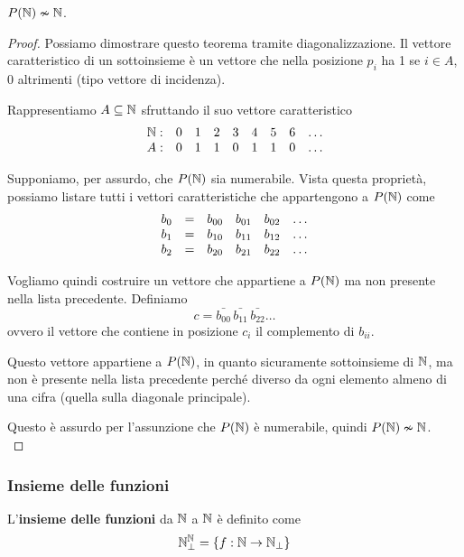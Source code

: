 \begin{theor}
	$P(\mathbb{N}) \nsim \mathbb{N}$.
\end{theor}
\begin{proof}
	Possiamo dimostrare questo teorema tramite diagonalizzazione. Il vettore caratteristico di un sottoinsieme è un vettore che nella posizione $p_i$ ha 1 se $i \in A$, 0 altrimenti (tipo vettore di incidenza).
	
	Rappresentiamo $A \subseteq \mathbb{N}$ sfruttando il suo vettore caratteristico
	$$ \begin{array}{c c c c c c c c c}
		\mathbb{N}: & 0 & 1 & 2 & 3 & 4 & 5 & 6 & \dots \\
		A: & 0 & 1 & 1 & 0 & 1 & 1 & 0 & \dots \\
	\end{array}$$
	
	Supponiamo, per assurdo, che $P (\mathbb{N})$ sia numerabile. Vista questa proprietà, possiamo listare tutti i vettori caratteristiche che appartengono a $P(\mathbb{N})$ come
	$$ 
	\begin{array}{c c c c c c}
		b_0 & = & b_{00} & b_{01} & b_{02} & \dots \\
		b_1 & = & b_{10} & b_{11} & b_{12} & \dots \\
		b_2 & = & b_{20} & b_{21} & b_{22} & \dots \\
	\end{array}
	$$
    
	Vogliamo quindi costruire un vettore che appartiene a $P(\mathbb{N})$ ma non presente nella lista precedente. Definiamo
	$$ c = \bar{b_{00}} \, \bar{b_{11}} \, \bar{b_{22}} \dots $$
	ovvero il vettore che contiene in posizione $c_i$ il complemento di $b_{ii}$.

	Questo vettore appartiene a $P(\mathbb{N})$, in quanto sicuramente sottoinsieme di $\mathbb{N}$, ma non è presente nella lista precedente perché diverso da ogni elemento almeno di una cifra (quella sulla diagonale principale). 
    
    Questo è assurdo per l'assunzione che $P(\mathbb{N})$ è numerabile, quindi $P(\mathbb{N}) \nsim \mathbb{N}$.\\
\end{proof}

\subsubsection{Insieme delle funzioni}

L'\textbf{insieme delle funzioni} da $\mathbb{N}$ a $\mathbb{N}$ è definito come
$$ \mathbb{N}^{\mathbb{N}}_\bot = \{f: \mathbb{N} \rightarrow \mathbb{N}_{\bot} \} $$


